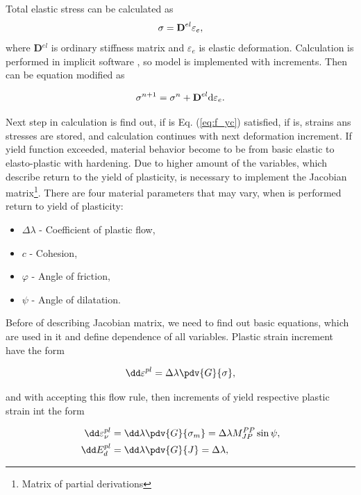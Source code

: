 Total elastic stress can be calculated as 
\begin{equation}\label{eq:f_sigma}
\sigma = \text{\textbf{D}}^{el} \varepsilon_e,
\end{equation}
where \textbf{D}$^{el}$ is ordinary stiffness matrix and $\varepsilon_e$ is elastic deformation. Calculation is performed in  implicit software \cite{mars}, so model is implemented with increments. Then can be equation modified as

\begin{equation}\label{eq:f_sigma1}
	\sigma^{n+1} = \sigma^n+ \text{\textbf{D}}^{el} \mathrm{d} \varepsilon_e.
\end{equation}

Next step in calculation is find out, if is Eq. (\ref{eq:f_yc}) satisfied, if is, strains ans stresses are stored, and calculation continues with next deformation increment. If yield function exceeded, material behavior become to be from basic elastic to elasto-plastic with hardening. Due to higher amount of the variables, which describe return to the yield of plasticity, is necessary to implement the Jacobian matrix\footnote{Matrix of partial derivations}. There are four material parameters that may vary, when is performed return to yield of plasticity:

\begin{itemize}
	\item $\Delta\lambda$ - Coefficient of plastic flow,
	\item $c$ - Cohesion,
	\item  $\varphi$ - Angle of friction,
	\item $\psi$ - Angle of dilatation.
\end{itemize}

Before of describing Jacobian matrix, we need to find out basic equations, which are used in it and define dependence of all variables. 
Plastic strain increment have the form 

\begin{equation}
	\dd \varepsilon^{pl} = \Delta \lambda \pdv{G}{\sigma},
\end{equation}

and with accepting this flow rule, then increments of yield respective plastic strain int the form 

\begin{align}
	\dd \varepsilon_\nu^{pl} &= \dd \lambda \pdv{G}{\sigma_m} = \Delta \lambda M_{JP}^{PP} \sin \psi,\\
	\dd E_{d}^{pl} &= \dd \lambda \pdv{G}{J} = \Delta \lambda,
\end{align}

